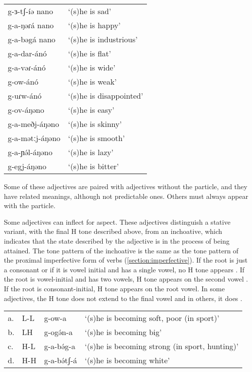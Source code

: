 \ea  %
\begin{tabular}[t]{ll}
g-ɜ-tʃ-íə nano & ‘(s)he  is sad’\\
g-a-ŋəɾá nano & ‘(s)he is happy’\\
g-a-bəgá nano & ‘(s)he is industrious’\\
g-a-dar-ánó & ‘(s)he is flat’\\
g-a-vəɾ-ánó & ‘(s)he is wide’\\
g-ow-ánó & ‘(s)he is weak’\\
g-uɾw-ánó & ‘(s)he is disappointed’\\
g-ov-áŋəno & ‘(s)he is easy’\\
g-a-meðj-áŋəno & ‘(s)he is skinny’\\
g-a-mətːj-áŋəno & ‘(s)he is smooth’\\
g-a-ɲə́l-áŋəno & ‘(s)he is lazy’\\
g-egj-áŋəno & ‘(s)he is bitter’\\
\end{tabular} \z

Some of these adjectives are paired with adjectives without the particle, and they have related meanings, although not predictable ones. Others must always appear with the particle.%

Some adjectives can inflect for aspect. These adjectives distinguish a stative variant, with the final H tone described above, from an inchoative, which indicates that the state described by the adjective is in the process of being attained. The tone pattern of the inchoative is the same as the tone pattern of the proximal imperfective form of verbs (\ref{section:imperfective}). If the root is just a consonant or if it is vowel initial and has a single vowel, no H tone appears \Next[a]. If the root is vowel-initial and has two vowels, H tone appears on the second vowel \Next[b]. If the root is consonant-initial, H tone appears on the root vowel. In some adjectives, the H tone does not extend to the final vowel \Next[c] and in others, it does \Next[d].

\ea 
\begin{tabular}[t]{llll}
a. & L-L & g-ow-a & ‘(s)he is becoming soft, poor (in sport)’\\
b. & LH & g-ogə́n-a & ‘(s)he is becoming big’	 	\\
c. & H-L & g-a-bə́g-a & ‘(s)he is becoming strong (in sport, 
						hunting)’\\
d. & H-H & g-a-bə́tʃ-á & ‘(s)he is becoming white’	\\
\end{tabular} \z

